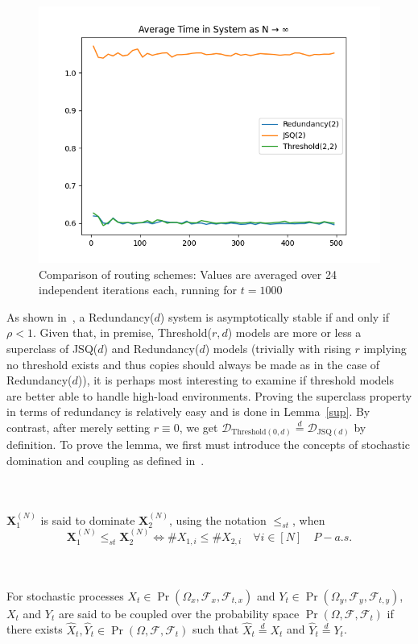 \begin{figure}
    \centering
    \includegraphics[width=0.7\linewidth]{compare_red_thr}
    \caption{Comparison of routing schemes: Values are averaged over 24 independent iterations each, running for $t=1000$}
    \label{fig:img}
\end{figure}

As shown in~\cite{gardner_redundancy-d_2017}, a Redundancy($d$) system is asymptotically stable if and only if $\rho < 1 $.
Given that, in premise, Threshold($r,d$) models are more or less a superclass of JSQ($d$) and Redundancy($d$) models (trivially with rising $r$  implying no threshold exists and thus copies should always be made as in the case of Redundancy($d$)), it is perhaps most interesting to examine if threshold models are better able to handle high-load environments.
Proving the superclass property in terms of redundancy is relatively easy and is done in Lemma~\ref{sup}.
By contrast, after merely setting $r \equiv 0$, we get $ \mathcal{D}_{\mathrm{Threshold}(0,d)} \overset{d}{=} \mathcal{D}_{\mathrm{JSQ}(d)}$ by definition.
To prove the lemma, we first must introduce the concepts of stochastic domination and coupling as defined in~\cite{bramson_asymptotic_2012}.
\begin{definition}
    \\~\\
    $\mathbf{X}_{1}^{(N)}$ is said to dominate $\mathbf{X}_{2}^{(N)}$, using the notation $\leq_{st}$, when
    \[\mathbf{X}_{1}^{(N)}\leq_{st}\mathbf{X}_{2}^{(N)} \iff\# X_{1,i} \leq \# X_{2,i}  \quad \forall i \in [N] \quad P-a.s.\]
\end{definition}

\begin{definition}
    \label{coupled}
    \\~\\
    For stochastic processes $X_{t} \in \Pr(\Omega_{x}, \mathcal{F}_{x}, \mathcal{F}_{t,x})$ and $Y_{t} \in \Pr(\Omega_{y}, \mathcal{F}_{y}, \mathcal{F}_{t,y})$,
    $X_{t}$ and $Y_{t}$ are said to be coupled over the probability space $\Pr(\Omega, \mathcal{F}, \mathcal{F}_{t})$ if there exists
    $\hat X_{t}, \hat Y_{t} \in \Pr(\Omega, \mathcal{F}, \mathcal{F}_{t})$ such that $\hat X_{t} \overset{d}{=}X_{t}$ and $\hat Y_{t} \overset{d}{=}Y_{t}$.
\end{definition}

